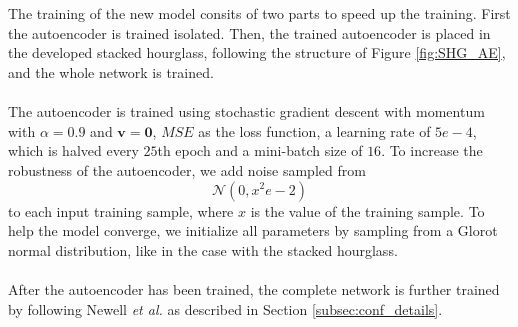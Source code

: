 \documentclass[./main.tex]{subfiles}
\begin{document}
\\
\\
The training of the new model consits of two parts to speed up the training. First the autoencoder is trained isolated. Then, the trained autoencoder is placed in the developed stacked hourglass, following the structure of Figure \ref{fig:SHG_AE}, and the whole network is trained.
\\
\\
The autoencoder is trained using stochastic gradient descent with momentum with $\alpha = 0.9$ and $\bm{v} = \bm{0}$, $MSE$ as the loss function, a learning rate of $5e-4$, which is halved every $25$th epoch and a mini-batch size of $16$. To increase the robustness of the autoencoder, we add noise sampled from
$$\mathcal{N} \left(0, x^2e-2 \right)$$
to each input training sample, where $x$ is the value of the training sample. To help the model converge, we initialize all parameters by sampling from a Glorot normal distribution, like in the case with the stacked hourglass.
\\
\\
After the autoencoder has been trained, the complete network is further trained by following Newell \textit{et al.} \cite{Newell} as described in Section \ref{subsec:conf_details}.
\end{document}
